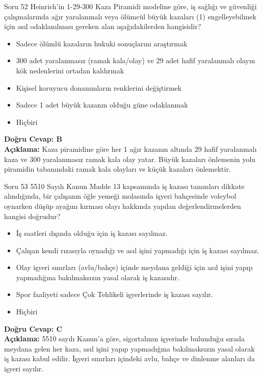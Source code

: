 \documentclass[12pt,a4paper]{article}
\begin{document}
\begin{testcard}{Soru 52}
    Heinrich'in 1-29-300 Kaza Piramidi modeline göre, iş sağlığı ve güvenliği çalışmalarında ağır yaralanmalı veya ölümcül büyük kazaları (1) engelleyebilmek için asıl odaklanılması gereken alan aşağıdakilerden hangisidir?
    \begin{itemize}
        \item[A)] Sadece ölümlü kazaların hukuki sonuçlarını araştırmak
        \item[B)] 300 adet yaralanmasız (ramak kala/olay) ve 29 adet hafif yaralanmalı olayın kök nedenlerini ortadan kaldırmak
        \item[C)] Kişisel koruyucu donanımların renklerini değiştirmek
        \item[D)] Sadece 1 adet büyük kazanın olduğu güne odaklanmak
        \item[E)] Hiçbiri
    \end{itemize}
    \tcblower
    \textbf{Doğru Cevap: B} \\
    \textbf{Açıklama:} Kaza piramidine göre her 1 ağır kazanın altında 29 hafif yaralanmalı kaza ve 300 yaralanmasız ramak kala olay yatar. Büyük kazaları önlemenin yolu piramidin tabanındaki ramak kala olayları ve küçük kazaları önlemektir.
\end{testcard}

\begin{testcard}{Soru 53}
    5510 Sayılı Kanun Madde 13 kapsamında iş kazası tanımları dikkate alındığında, bir çalışanın öğle yemeği molasında işyeri bahçesinde voleybol oynarken düşüp ayağını kırması olayı hakkında yapılan değerlendirmelerden hangisi doğrudur?
    \begin{itemize}
        \item[A)] İş saatleri dışında olduğu için iş kazası sayılmaz.
        \item[B)] Çalışan kendi rızasıyla oynadığı ve asıl işini yapmadığı için iş kazası sayılmaz.
        \item[C)] Olay işyeri sınırları (avlu/bahçe) içinde meydana geldiği için asıl işini yapıp yapmadığına bakılmaksızın yasal olarak iş kazasıdır.
        \item[D)] Spor faaliyeti sadece Çok Tehlikeli işyerlerinde iş kazası sayılır.
        \item[E)] Hiçbiri
    \end{itemize}
    \tcblower
    \textbf{Doğru Cevap: C} \\
    \textbf{Açıklama:} 5510 sayılı Kanun'a göre, sigortalının işyerinde bulunduğu sırada meydana gelen her kaza, asıl işini yapıp yapmadığına bakılmaksızın yasal olarak iş kazası kabul edilir. İşyeri sınırları içindeki avlu, bahçe ve dinlenme alanları da işyeri sayılır.
\end{testcard}
\end{document}
